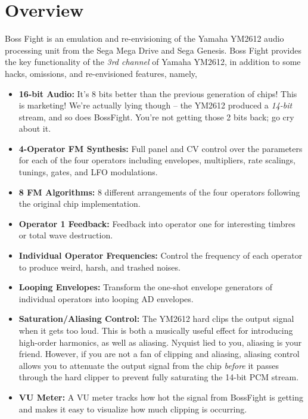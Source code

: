 \documentclass[12pt,letter]{article}
\begin{document}


\section{Overview}

Boss Fight is an emulation and re-envisioning of the Yamaha YM2612 audio processing unit from the Sega Mega Drive and Sega Genesis. Boss Fight provides the key functionality of the \textit{3rd channel} of Yamaha YM2612, in addition to some hacks, omissions, and re-envisioned features, namely,
\begin{itemize}
  \item \textbf{16-bit Audio:} It's 8 bits better than the previous generation of chips! This is marketing! We're actually lying though -- the YM2612 produced a \textit{14-bit} stream, and so does BossFight. You're not getting those 2 bits back; go cry about it.
  \item \textbf{4-Operator FM Synthesis:} Full panel and CV control over the parameters for each of the four operators including envelopes, multipliers, rate scalings, tunings, gates, and LFO modulations.
  \item \textbf{8 FM Algorithms:} 8 different arrangements of the four operators following the original chip implementation.
  \item \textbf{Operator 1 Feedback:} Feedback into operator one for interesting timbres or total wave destruction.
  \item \textbf{Individual Operator Frequencies:} Control the frequency of each operator to produce weird, harsh, and trashed noises.
  \item \textbf{Looping Envelopes:} Transform the one-shot envelope generators of individual operators into looping AD envelopes.
  \item \textbf{Saturation/Aliasing Control:} The YM2612 hard clips the output signal when it gets too loud. This is both a musically useful effect for introducing high-order harmonics, as well as aliasing. Nyquist lied to you, aliasing is your friend. However, if you are not a fan of clipping and aliasing, aliasing control allows you to attenuate the output signal from the chip \textit{before} it passes through the hard clipper to prevent fully saturating the 14-bit PCM stream.
  \item \textbf{VU Meter:} A VU meter tracks how hot the signal from BossFight is getting and makes it easy to visualize how much clipping is occurring.

\end{itemize}
\end{document}
